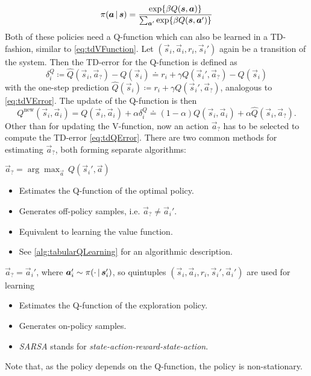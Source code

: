 		\begin{equation*}
			\pi(\bm{a} \,\vert\, \bm{s}) = \frac{\exp{ \beta Q(\bm{s}, \bm{a}) }}{\sum_{\bm{a}'} \exp{ \beta Q(\bm{s}, \bm{a}') }}
		\end{equation*}
		Both of these policies need a Q-function which can also be learned in a TD-fashion, similar to \eqref{eq:tdVFunction}. Let \( (\vec{s}_i, \vec{a}_i, r_i, \vec{s}_i') \) again be a transition of the system. Then the TD-error for the Q-function is defined as
		\begin{equation}
			\delta_i^Q \coloneqq \hat{Q}(\vec{s}_i, \vec{a}_?) - Q(\vec{s}_i) \doteq r_i + \gamma Q(\vec{s}_i', \vec{a}_?) - Q(\vec{s}_i)  \label{eq:tdQError}
		\end{equation}
		with the one-step prediction \( \hat{Q}(\vec{s}_i) \coloneqq r_i + \gamma Q(\vec{s}_i', \vec{a}_?) \), analogous to \eqref{eq:tdVError}. The update of the Q-function is then
		\begin{equation*}
			Q^\mathrm{new}(\vec{s}_i, \vec{a}_i) = Q(\vec{s}_i, \vec{a}_i) + \alpha \delta_i^Q \doteq (1 - \alpha) Q(\vec{s}_i, \vec{a}_i) + \alpha \hat{Q}(\vec{s}_i, \vec{a}_?).
		\end{equation*}
		Other than for updating the V-function, now an action \( \vec{a}_? \) has to be selected to compute the TD-error \eqref{eq:tdQError}. There are two common methods for estimating \(\vec{a}_?\), both forming separate algorithms:
		\begin{description}[leftmargin=3cm]
			\item[Q-Learning] \( \vec{a}_? = \arg\max_{\vec{a}} \, Q(\vec{s}_i', \vec{a}) \)
				\begin{itemize}
					\item Estimates the Q-function of the optimal policy.
					\item Generates off-policy samples, i.e. \( \vec{a}_? \neq \vec{a}_i' \).
					\item Equivalent to learning the value function.
					\item See \autoref{alg:tabularQLearning} for an algorithmic description.
				\end{itemize}
			\item[SARSA]      \( \vec{a}_? = \vec{a}_i' \), where \( \bm{a}_i' \sim \pi(\cdot \,\vert\, \bm{s}_i') \), so quintuples \( (\vec{s}_i, \vec{a}_i, r_i, \vec{s}_i', \vec{a}_i') \) are used for learning
				\begin{itemize}
					\item Estimates the Q-function of the exploration policy.
					\item Generates on-policy samples.
					\item \emph{SARSA} stands for \emph{state-action-reward-state-action}.
				\end{itemize}
		\end{description}
		Note that, as the policy depends on the Q-function, the policy is non-stationary.

